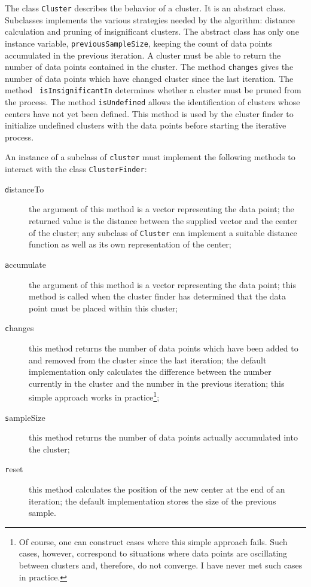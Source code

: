 {The class \texttt{Cluster} describes the behavior of a cluster. It is
an abstract class. Subclasses implements the various strategies
needed by the algorithm: distance calculation and pruning of
insignificant clusters. The abstract class has only one instance
variable, \texttt{previousSampleSize}, keeping the count of data
points accumulated in the previous iteration. A cluster must be
able to return the number of data points contained in the cluster.
The method \texttt{changes} gives the number of data points which
have changed cluster since the last iteration. The method \texttt{
isInsignificantIn} determines whether a cluster must be pruned
from the process. The method \texttt{isUndefined} allows the
identification of clusters whose centers have not yet been
defined. This method is used by the cluster finder to initialize
undefined clusters with the data points before starting the
iterative process.

An instance of a subclass of \texttt{cluster} must implement the
following methods to interact with the class \texttt{ClusterFinder}:
\begin{description}
  \item[\texttt distanceTo] the argument of this method is a vector
  representing the data point; the returned value is the distance
  between the supplied vector and the center of the cluster; any
  subclass of \texttt{Cluster} can implement a suitable distance function
  as well as its own representation of the center;
  \item[\texttt accumulate] the argument of this method is a vector
  representing the data point; this method is called when the
  cluster finder has determined that the data point must be placed
  within this cluster;
  \item[\texttt changes] this method returns the number of data points
  which have been added to and removed from the cluster since the
  last iteration; the default implementation only calculates the
  difference between the number currently in the cluster and the
  number in the previous iteration; this simple approach works in
  practice\footnote{Of course, one can construct cases where this
  simple approach fails. Such cases, however, correspond to
  situations where data points are oscillating between clusters
  and, therefore, do not converge. I have never met such cases in practice.};
  \item[\texttt sampleSize] this method returns the number of data
  points actually accumulated into the cluster;
  \item[\texttt reset] this method calculates the position of the new
  center at the end of an iteration; the default implementation
  stores the size of the previous sample.
\end{description}

}
